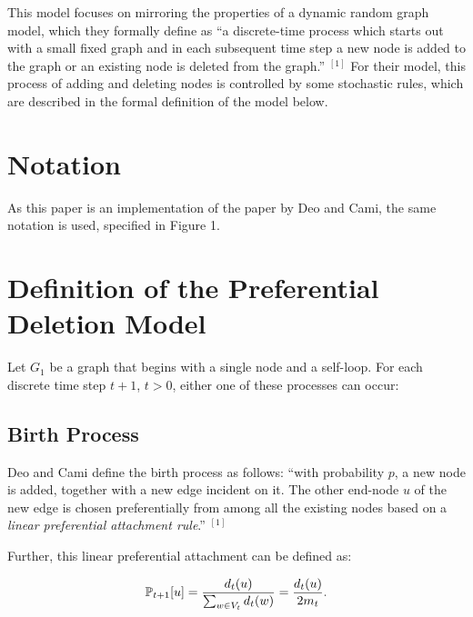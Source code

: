 \documentclass[final,3p,times,twocolumn]{elsarticle}
\begin{document}
This model focuses on mirroring the properties of a dynamic random graph model, which they formally define as “a discrete-time process which starts out with a small fixed graph and in each subsequent time step a new node is added to the graph or an existing node is deleted from the graph.” $^{[1]}$ For their model, this process of adding and deleting nodes is controlled by some stochastic rules, which are described in the formal definition of the model below.

\section{Notation}
\label{S:2}

As this paper is an implementation of the paper by Deo and Cami, the same notation is used, specified in Figure 1.

\section{Definition of the Preferential Deletion Model}
\label{S:3}

Let $G_1$ be a graph that begins with a single node and a self-loop. For each discrete time step $t + 1$, $t > 0$, either one of these processes can occur:

\subsection{Birth Process}

Deo and Cami define the birth process as follows: “with probability $p$, a new node is added, together with a new edge incident on it. The other end-node $u$ of the new edge is chosen preferentially from among all the existing nodes based on a \textit{linear preferential attachment rule}.” $^{[1]}$

Further, this linear preferential attachment can be defined as:

\begin{equation}
\centering
    \mathbb{P}_{t + 1}[u] = \frac{d_t(u)}{\sum_{w \in V_t} d_t(w)} = \frac{d_t(u)}{2m_t}.
\end{equation}
\end{document}
